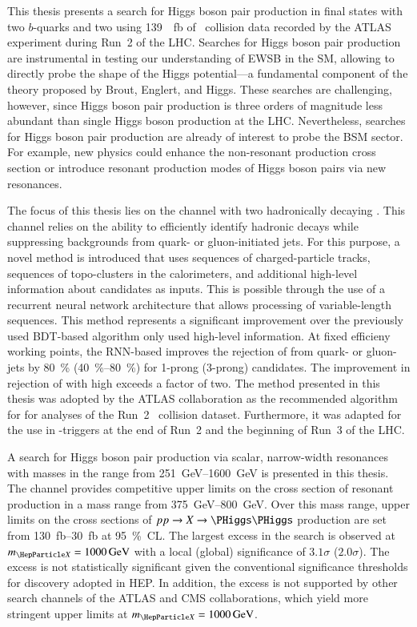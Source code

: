 This thesis presents a search for Higgs boson pair production in final states
with two $b$-quarks and two \tauleptons using \SI{139}{\per\femto\barn} of
\pp~collision data recorded by the ATLAS experiment during Run~2 of the
LHC. Searches for Higgs boson pair production are instrumental in testing our
understanding of EWSB in the SM, allowing to directly probe the shape of the
Higgs potential---a fundamental component of the theory proposed by Brout,
Englert, and Higgs. These searches are challenging, however, since Higgs boson
pair production is three orders of magnitude less abundant than single Higgs
boson production at the LHC. Nevertheless, searches for Higgs boson pair
production are already of interest to probe the BSM sector. For example, new
physics could enhance the non-resonant \HH production cross section or introduce
resonant production modes of Higgs boson pairs via new resonances.

The focus of this thesis lies on the channel with two hadronically decaying
\tauleptons. This channel relies on the ability to efficiently identify hadronic
\taulepton decays while suppressing backgrounds from quark- or gluon-initiated
jets. For this purpose, a novel \tauid method is introduced that uses sequences
of charged-particle tracks, sequences of topo-clusters in the calorimeters, and
additional high-level information about \tauhadvis candidates as inputs. This is
possible through the use of a recurrent neural network architecture that allows
processing of variable-length sequences. This method represents a significant
improvement over the previously used BDT-based algorithm only used high-level
information. At fixed \tauhadvis efficieny working points, the RNN-based \tauid
improves the rejection of \faketauhadvis from quark- or gluon-jets by
\SI{80}{\percent} (\SIrange{40}{80}{\percent}) for 1-prong (3-prong) \tauhadvis
candidates. The improvement in rejection of \faketauhadvis with high \pT exceeds
a factor of two. The method presented in this thesis was adopted by the ATLAS
collaboration as the recommended algorithm for \tauid for analyses of the Run~2
\pp~collision dataset. Furthermore, it was adapted for the use in
\tauhadvis-triggers at the end of Run~2 and the beginning of Run~3 of the LHC.

A search for Higgs boson pair production via scalar, narrow-width resonances
with masses in the range from \SIrange{251}{1600}{\GeV} is presented in this
thesis. The \bbtautau channel provides competitive upper limits on the cross
section of resonant \HH production in a mass range from
\SIrange{375}{800}{\GeV}. Over this mass range, upper limits on the cross
sections of $pp \to X \to \HH$ production are set from
\SIrange{130}{30}{\femto\barn} at \SI{95}{\percent}~CL. The largest excess in
the search is observed at $\mX = \SI{1000}{\GeV}$ with a local (global)
significance of $3.1\sigma$ ($2.0\sigma$). The excess is not statistically
significant given the conventional significance thresholds for discovery adopted
in HEP. In addition, the excess is not supported by other search channels of the
ATLAS and CMS collaborations, which yield more stringent upper limits at
$\mX = \SI{1000}{\GeV}$.


